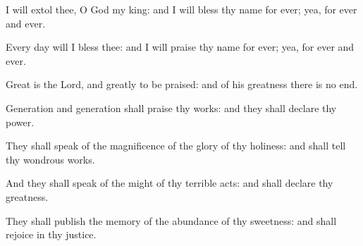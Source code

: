 ﻿\item I will extol thee, O God my king: and I will bless thy name for ever; yea, for ever and ever.
\item Every day will I bless thee: and I will praise thy name for ever; yea, for ever and ever.
\item Great is the Lord, and greatly to be praised: and of his greatness there is no end.
\item Generation and generation shall praise thy works: and they shall declare thy power.
\item They shall speak of the magnificence of the glory of thy holiness: and shall tell thy wondrous works.
\item And they shall speak of the might of thy terrible acts: and shall declare thy greatness.
\item They shall publish the memory of the abundance of thy sweetness: and shall rejoice in thy justice.